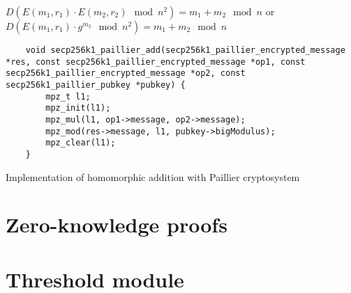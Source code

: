 $D(E(m_1, r_1) \cdot E(m_2, r_2) \mod n^2) = m_1 + m_2 \mod n$ or $D(E(m_1, r_1) \cdot g^{m_2} \mod n^2) = m_1 + m_2 \mod n$

\begin{listing}
  \begin{verbatim}
    void secp256k1_paillier_add(secp256k1_paillier_encrypted_message *res, const secp256k1_paillier_encrypted_message *op1, const secp256k1_paillier_encrypted_message *op2, const secp256k1_paillier_pubkey *pubkey) {
        mpz_t l1;
        mpz_init(l1);
        mpz_mul(l1, op1->message, op2->message);
        mpz_mod(res->message, l1, pubkey->bigModulus);
        mpz_clear(l1);
    }
  \end{verbatim}
	\caption{Implementation of homomorphic addition with Paillier cryptosystem}
	\label{lst:implDecryptPaillier}
\end{listing}


\section{Zero-knowledge proofs}
\lipsum[1-2]

\section{Threshold module}
\lipsum[1-2]
